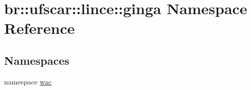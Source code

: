 \hypertarget{namespacebr_1_1ufscar_1_1lince_1_1ginga}{
\section{br::ufscar::lince::ginga Namespace Reference}
\label{namespacebr_1_1ufscar_1_1lince_1_1ginga}
}
\subsection*{Namespaces}
\begin{DoxyCompactItemize}
\item 
namespace \hyperlink{namespacebr_1_1ufscar_1_1lince_1_1ginga_1_1wac}{wac}
\end{DoxyCompactItemize}

